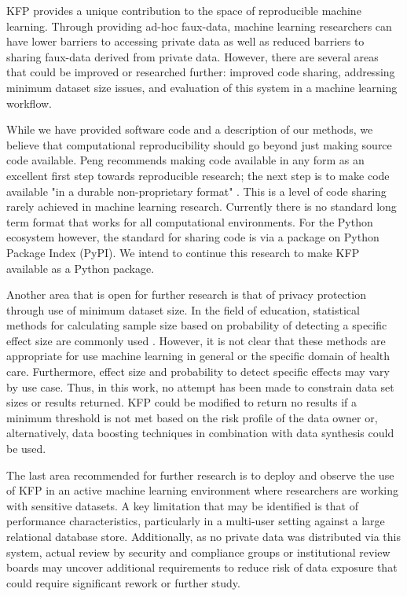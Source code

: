\documentclass{article}
\begin{document}
KFP provides a unique contribution to the space of reproducible machine learning. Through providing ad-hoc faux-data, machine learning researchers can have lower barriers to accessing private data as well as reduced barriers to sharing faux-data derived from private data. However, there are several areas that could be improved or researched further: improved code sharing, addressing minimum dataset size issues, and evaluation of this system in a machine learning workflow.

While we have provided software code and a description of our methods, we believe that computational reproducibility should go beyond just making source code available. Peng recommends making code available in any form as an excellent first step towards reproducible research; the next step is to make code available "in a durable non-proprietary format" \cite{peng_reproducible_2011}. This is a level of code sharing rarely achieved in machine learning research. Currently there is no standard long term format that works for all computational environments. For the Python ecosystem however, the standard for sharing code is via a package on Python Package Index (PyPI). We intend to continue this research to make KFP available as a Python package.

Another area that is open for further research is that of privacy protection through use of minimum dataset size. In the field of education, statistical methods for calculating sample size based on probability of detecting a specific effect size are commonly used \cite{naep_2009}. However, it is not clear that these methods are appropriate for use machine learning in general or the specific domain of health care. Furthermore, effect size and probability to detect specific effects may vary by use case. Thus, in this work, no attempt has been made to constrain data set sizes or results returned. KFP could be modified to return no results if a minimum threshold is not met based on the risk profile of the data owner or, alternatively, data boosting techniques in combination with data synthesis could be used.

The last area recommended for further research is to deploy and observe the use of KFP in an active machine learning environment where researchers are working with sensitive datasets. A key limitation that may be identified is that of performance characteristics, particularly in a multi-user setting against a large relational database store. Additionally, as no private data was distributed via this system, actual review by security and compliance groups or institutional review boards may uncover additional requirements to reduce risk of data exposure that could require significant rework or further study.
\end{document}

